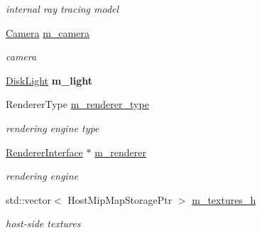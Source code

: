 \begin{DoxyCompactItemize}
\begin{DoxyCompactList}\small\item\em internal ray tracing model \end{DoxyCompactList}\item 
\mbox{\label{struct_renderer_a2df1e635ecdcb423766b70eb29154a4f}} 
\hyperlink{struct_camera}{Camera} \hyperlink{struct_renderer_a2df1e635ecdcb423766b70eb29154a4f}{m\+\_\+camera}
\begin{DoxyCompactList}\small\item\em camera \end{DoxyCompactList}\item 
\mbox{\label{struct_renderer_ac75e08409f209f179325321c6f2598fd}} 
\hyperlink{struct_disk_light}{Disk\+Light} {\bfseries m\+\_\+light}
\item 
\mbox{\label{struct_renderer_a9c3c0f10d3afd31a1a1984cdc7d219eb}} 
Renderer\+Type \hyperlink{struct_renderer_a9c3c0f10d3afd31a1a1984cdc7d219eb}{m\+\_\+renderer\+\_\+type}
\begin{DoxyCompactList}\small\item\em rendering engine type \end{DoxyCompactList}\item 
\mbox{\label{struct_renderer_a9dcf9f8890e95fac4b8a5e7b543ed2d0}} 
\hyperlink{struct_renderer_interface}{Renderer\+Interface} $\ast$ \hyperlink{struct_renderer_a9dcf9f8890e95fac4b8a5e7b543ed2d0}{m\+\_\+renderer}
\begin{DoxyCompactList}\small\item\em rendering engine \end{DoxyCompactList}\item 
\mbox{\label{struct_renderer_a361738bfb8bae7037abe0cd4d4b9cd1c}} 
std\+::vector$<$ Host\+Mip\+Map\+Storage\+Ptr $>$ \hyperlink{struct_renderer_a361738bfb8bae7037abe0cd4d4b9cd1c}{m\+\_\+textures\+\_\+h}
\begin{DoxyCompactList}\small\item\em host-\/side textures \end{DoxyCompactList}\item 
\mbox{\label{struct_renderer_a011679da0b623ca4300b66df88156361}} 

\end{DoxyCompactItemize}

